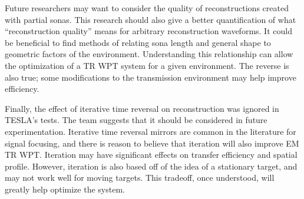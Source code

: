 Future researchers may want to consider the quality of reconstructions created with partial sonas.  This research should also give a better quantification of what ``reconstruction quality'' means for arbitrary reconstruction waveforms. It could be beneficial to find methods of relating sona length and general shape to geometric factors of the environment. Understanding this relationship can allow the optimization of a TR WPT system for a given environment. The reverse is also true; some modifications to the transmission environment may help improve efficiency.

Finally, the effect of iterative time reversal on reconstruction was ignored in TESLA's tests.  The team suggests that it should be considered in future experimentation. Iterative time reversal mirrors are common in the literature for signal focusing, and there is reason to believe that iteration will also improve EM TR WPT.  Iteration may have significant effects on transfer efficiency and spatial profile.  However, iteration is also based off of the idea of a stationary target, and may not work well for moving targets.  This tradeoff, once understood, will greatly help optimize the system.
